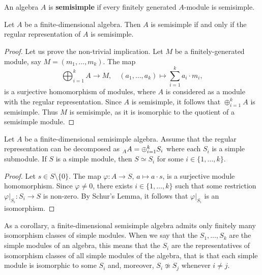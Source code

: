 \chapter{}

\begin{definition}
    An algebra $A$ is \textbf{semisimple} if every finitely generated $A$-module is semisimple. 
\end{definition}

\begin{proposition}
Let $A$ be a finite-dimensional algebra. Then $A$ is semisimple if and only if 
the regular representation of $A$ is semisimple. 
\end{proposition}

\begin{proof}
Let us prove the non-trivial implication. Let $M$ be a finitely-generated module, say $M=(m_1,\dots,m_k)$. 
The map
\[
\bigoplus_{i=1}^k A\to M,\quad
(a_1,\dots,a_k)\mapsto \sum_{i=1}^k a_i\cdot m_i,
\]
is a surjective homomorphism of modules, where $A$ is considered as a module with the regular
representation. Since 
$A$ is semisimple, it follows that $\oplus_{i=1}^kA$ is semisimple. 
Thus $M$ is semisimple, as it is isomorphic to the quotient of a semisimple module.
\end{proof}

\begin{theorem}
Let $A$ be a finite-dimensional semisimple algebra. 
Assume that the regular representation can be decomposed as $\prescript{}{A}A=\oplus_{i=1}^k S_i$ where each $S_i$ is a simple submodule.  
If $S$ is a simple module, then $S\simeq S_i$ for some $i\in\{1,\dots,k\}$. 
\end{theorem}

\begin{proof}
Let $s\in S\setminus\{0\}$. The map $\varphi\colon A\to S$, $a\mapsto a\cdot s$, is a surjective module homomorphism. Since 
$\varphi\ne 0$, there exists $i\in\{1,\dots,k\}$ such that some restriction 
$\varphi|_{S_i}\colon S_i\to S$ is non-zero. By Schur's Lemma, it follows that  
$\varphi|_{S_i}$ is an isomorphism.   	
\end{proof}

As a corollary, a finite-dimensional semisimple algebra admits 
only finitely many isomorphism classes of simple modules. When we say that 
the $S_1,\dots,S_k$ are the simple modules of an algebra, this means that the $S_i$ are the representatives
of isomorphism classes of all simple modules of the algebra, that is that each simple module is isomorphic to
some $S_i$ and, moreover,  
$S_i\not\simeq S_j$ whenever $i\ne j$. 

